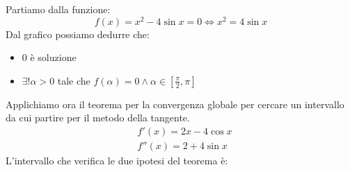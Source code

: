 \begin{example}
	Partiamo dalla funzione:
	\begin{equation*}
		f(x)=x^2-4\sin x = 0 \Leftrightarrow x^2 = 4 \sin x
	\end{equation*}
	Dal grafico possiamo dedurre che:
	\begin{itemize}
		\item $0$ è soluzione
		\item $\exists ! \alpha > 0$ tale che $f(\alpha)=0 \land \alpha \in [\frac{\pi}{2},\pi]$
	\end{itemize}
	\begin{center}
	\end{center}
	Applichiamo ora il teorema per la convergenza globale per cercare un intervallo da cui partire per il metodo della tangente.
	\begin{align*}
		& f'(x) = 2x-4\cos x \\
		& f''(x)=2+4 \sin x
	\end{align*}
	L'intervallo che verifica le due ipotesi del teorema è:
	\begin{equation*}
		[0, \pi]
	\end{equation*}
\end{example}

